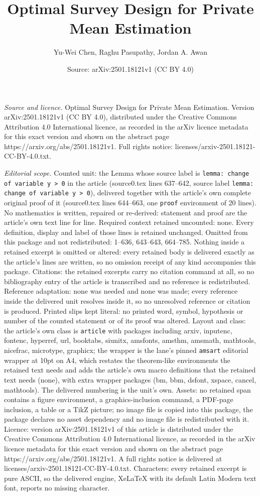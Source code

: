 \documentclass[10pt,a4paper]{amsart}
\title[Optimal Survey Design for Private Mean Estimation]{Optimal Survey Design for Private Mean Estimation}
\author{Yu-Wei Chen, Raghu Pasupathy, Jordan A. Awan}
\date{Source: arXiv:2501.18121v1 (CC BY 4.0)}
\begin{document}
\maketitle

\noindent\emph{Source and licence.} Optimal Survey Design for Private Mean Estimation. Version arXiv:2501.18121v1 (CC BY 4.0), distributed under the Creative Commons Attribution 4.0 International licence, as recorded in the arXiv licence metadata for this exact version and shown on the abstract page https://arxiv.org/abs/2501.18121v1. Full rights notice: licenses/arxiv-2501.18121-CC-BY-4.0.txt.\par\smallskip

\noindent\textit{Editorial scope.} Counted unit: the Lemma whose source label is \texttt{lemma: change of variable y > 0} in the article (source0.tex lines 637--642, source label \texttt{lemma: change of variable y > 0}), delivered together with the article's own complete original proof of it (source0.tex lines 644--663, one \texttt{proof} environment of 20 lines). No mathematics is written, repaired or re-derived: statement and proof are the article's own text line for line. Required context retained uncounted: none. Every definition, display and label of those lines is retained unchanged. Omitted from this package and not redistributed: 1--636, 643--643, 664--785. Nothing inside a retained excerpt is omitted or altered: every retained body is delivered exactly as the article's lines are written, so no omission receipt of any kind accompanies this package. Citations: the retained excerpts carry no citation command at all, so no bibliography entry of the article is transcribed and no reference is redistributed. Reference adaptation: none was needed and none was made; every reference inside the delivered unit resolves inside it, so no unresolved reference or citation is produced. Printed slips kept literal: no printed word, symbol, hypothesis or number of the counted statement or of its proof was altered. Layout and class: the article's own class is \texttt{article} with packages including arxiv, inputenc, fontenc, hyperref, url, booktabs, siunitx, amsfonts, amsthm, amsmath, mathtools, nicefrac, microtype, graphicx; the wrapper is the lane's pinned \texttt{amsart} editorial wrapper at 10pt on A4, which restates the theorem-like environments the retained text needs and adds the article's own macro definitions that the retained text needs (none), with extra wrapper packages (bm, bbm, dsfont, xspace, cancel, mathtools). The delivered numbering is the unit's own. Assets: no retained span contains a figure environment, a graphics-inclusion command, a PDF-page inclusion, a table or a TikZ picture; no image file is copied into this package, the package declares no asset dependency and no image file is redistributed with it. Licence: version arXiv:2501.18121v1 of this article is distributed under the Creative Commons Attribution 4.0 International licence, as recorded in the arXiv licence metadata for this exact version and shown on the abstract page https://arxiv.org/abs/2501.18121v1. A full rights notice is delivered at licenses/arxiv-2501.18121-CC-BY-4.0.txt. Characters: every retained excerpt is pure ASCII, so the delivered engine, XeLaTeX with its default Latin Modern text font, reports no missing character.
\end{document}
